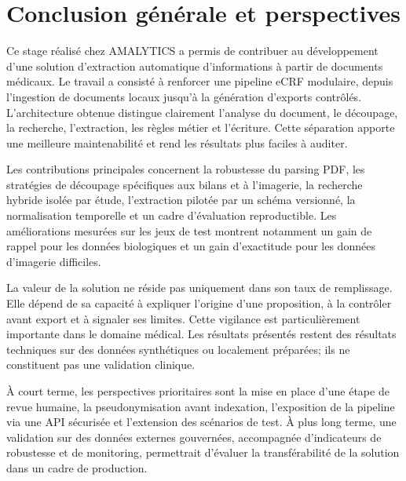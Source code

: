 \chapter*{Conclusion générale et perspectives}

Ce stage réalisé chez AMALYTICS a permis de contribuer au développement d'une solution d'extraction automatique d'informations à partir de documents médicaux. Le travail a consisté à renforcer une pipeline eCRF modulaire, depuis l'ingestion de documents locaux jusqu'à la génération d'exports contrôlés. L'architecture obtenue distingue clairement l'analyse du document, le découpage, la recherche, l'extraction, les règles métier et l'écriture. Cette séparation apporte une meilleure maintenabilité et rend les résultats plus faciles à auditer.

Les contributions principales concernent la robustesse du parsing PDF, les stratégies de découpage spécifiques aux bilans et à l'imagerie, la recherche hybride isolée par étude, l'extraction pilotée par un schéma versionné, la normalisation temporelle et un cadre d'évaluation reproductible. Les améliorations mesurées sur les jeux de test montrent notamment un gain de rappel pour les données biologiques et un gain d'exactitude pour les données d'imagerie difficiles.

La valeur de la solution ne réside pas uniquement dans son taux de remplissage. Elle dépend de sa capacité à expliquer l'origine d'une proposition, à la contrôler avant export et à signaler ses limites. Cette vigilance est particulièrement importante dans le domaine médical. Les résultats présentés restent des résultats techniques sur des données synthétiques ou localement préparées; ils ne constituent pas une validation clinique.

À court terme, les perspectives prioritaires sont la mise en place d'une étape de revue humaine, la pseudonymisation avant indexation, l'exposition de la pipeline via une API sécurisée et l'extension des scénarios de test. À plus long terme, une validation sur des données externes gouvernées, accompagnée d'indicateurs de robustesse et de monitoring, permettrait d'évaluer la transférabilité de la solution dans un cadre de production.
